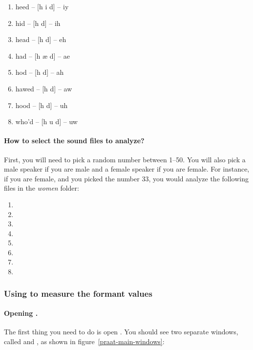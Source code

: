\begin{enumerate}
\item heed -- [h i\textlengthmark{} d] -- iy
\item hid -- [h \textsci{} d] -- ih
\item head -- [h \textepsilon{} d] -- eh
\item had -- [h \ae{} d] -- ae
\item hod -- [h \textscripta\textlengthmark{} d] -- ah
\item hawed -- [h \textopeno\textlengthmark{} d] -- aw
\item hood -- [h \textupsilon{} d] -- uh
\item who'd -- [h u\textlengthmark{} d] -- uw
\end{enumerate}

\paragraph{How to select the sound files to analyze?} First, you will need to pick a random number between 1--50. You will also pick a male speaker if you are male and a female speaker if you are female. For instance, if you are female, and you picked the number 33, you would analyze the following files in the \emph{women} folder:

\begin{enumerate}
\item {}
\item {}
\item {}
\item {}
\item {}
\item {}
\item {}
\item {}
\end{enumerate}

\subsubsection{Using \Praat{} to measure the formant values}

\paragraph{Opening \Praat{}.} The first thing you need to do is open \Praat{}. You should see two separate windows, called  and , as shown in figure~\ref{praat-main-windows}:


